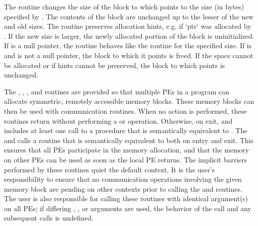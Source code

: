 \begin{apidefinition}
{    The  routine changes the size of the block to which
     points to the size (in bytes) specified by .  The contents
    of the block are unchanged up to the lesser of the new and old sizes.
	The  routine preserves allocation hints, e.g. if `ptr`
	was allocated by .
	If the new size is larger, the newly allocated portion of the block is
    uninitialized.  If  is a null pointer, the
     routine behaves like the  routine for
    the specified size.  If  is  and  is not a
    null pointer, the block to which it points is freed. If the space cannot
    be allocated or if hints cannot be preserved, the block to which 
	points is unchanged.
    
    The , , , and  routines
    are provided  so that multiple \acp{PE} in a program can allocate symmetric,
    remotely accessible memory blocks.  These memory blocks can then be used with
    \openshmem communication routines.  When no action is performed, these
    routines return without performing a  or
	 operation.
	Otherwise, on exit,  and  includes at least
	one call to a procedure that is semantically equivalent to
	. The  and 
	calls a routine that is semantically equivalent to
	 both on entry and exit.
    This ensures that all
    \acp{PE} participate in the memory allocation, and that the memory on other
    \acp{PE} can be used as soon as the local \ac{PE} returns.
    The implicit barriers performed by these routines quiet the
    default context.  It is the user's responsibility to ensure that no
    communication operations involving the given memory block are pending on
    other contexts prior to calling
    the  and  routines.
    The user is also
    responsible for calling these routines with identical argument(s) on all
    \acp{PE}; if differing , , or  arguments are used, the behavior of the call
    and any subsequent \openshmem calls is undefined.
}

\end{apidefinition}
